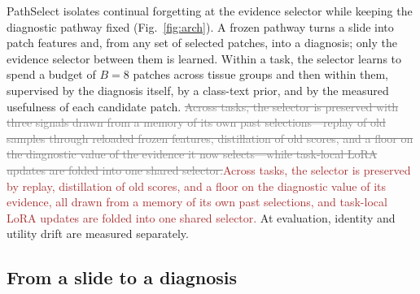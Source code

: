 \documentclass{article}
\newif\ifmarkup \markuptrue
\newcommand{\repc}[3]{\ifmarkup\textcolor{gray}{\sout{#2}}\textcolor{#1}{#3}\else#3\fi}
\newcommand{\repB}[2]{\repc{brown}{#1}{#2}}   %
\begin{document}
PathSelect isolates continual forgetting at the evidence selector while keeping the diagnostic pathway fixed (Fig.~\ref{fig:arch}). A frozen pathway turns a slide into patch features and, from any set of selected patches, into a diagnosis; only the evidence selector between them is learned. Within a task, the selector learns to spend a budget of $B=8$ patches across tissue groups and then within them, supervised by the diagnosis itself, by a class-text prior, and by the measured usefulness of each candidate patch. \repB{Across tasks, the selector is preserved with three signals drawn from a memory of its own past selections---replay of old samples through reloaded frozen features, distillation of old scores, and a floor on the diagnostic value of the evidence it now selects---while task-local LoRA updates are folded into one shared selector.}{Across tasks, the selector is preserved by replay, distillation of old scores, and a floor on the diagnostic value of its evidence, all drawn from a memory of its own past selections, and task-local LoRA updates are folded into one shared selector.} At evaluation, identity and utility drift are measured separately.

\subsection{From a slide to a diagnosis}
\label{ssec:setup}
\end{document}

